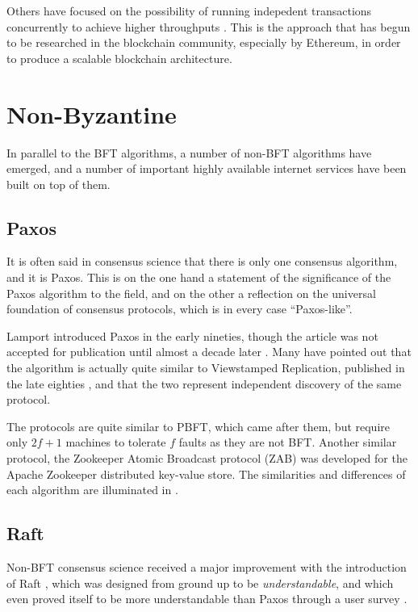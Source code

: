 Others have focused on the possibility of running indepedent transactions concurrently to achieve higher throughputs \cite{kotla2004high}.
This is the approach that has begun to be researched in the blockchain community, especially by Ethereum, in order to produce a scalable blockchain architecture.

\section{Non-Byzantine}

In parallel to the BFT algorithms, a number of non-BFT algorithms have emerged, and a 
number of important highly available internet services have been built on top of them.

\subsection{Paxos}

It is often said in consensus science that there is only one consensus algorithm, and it is Paxos.
This is on the one hand a statement of the significance of the Paxos algorithm to the field,
and on the other a reflection on the universal foundation of consensus protocols,
which is in every case ``Paxos-like''.

Lamport introduced Paxos in the early nineties, though the article was not accepted for publication until 
almost a decade later \cite{paxos}.
Many have pointed out that the algorithm is actually quite similar to Viewstamped Replication,
published in the late eighties \cite{oki1988viewstamped},
and that the two represent independent discovery of the same protocol.

The protocols are quite similar to PBFT, which came after them, 
but require only $2f+1$ machines to tolerate $f$ faults as they are not BFT.
Another similar protocol, the Zookeeper Atomic Broadcast protocol (ZAB) \cite{junqueira2011zab}
was developed for the Apache Zookeeper distributed key-value store.
The similarities and differences of each algorithm are illuminated in \cite{van2015vive}.

\subsection{Raft} 

Non-BFT consensus science received a major improvement with the introduction of Raft \cite{raft},
which was designed from ground up to be \emph{understandable}, 
and which even proved itself to be more understandable than Paxos through a user survey \cite{raft_thesis}.


